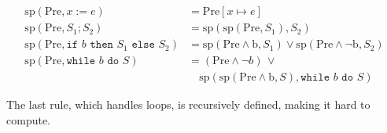 \documentclass[sigconf]{acmart}
\begin{document}
{\setlength{\abovedisplayskip}{2pt}
 \setlength{\belowdisplayskip}{2pt}
 \setlength{\jot}{1pt}
\begin{align*}
  \mathrm{sp}(\mathrm{Pre}, x := e) &= \mathrm{Pre}[x \mapsto e] \\
  \mathrm{sp}(\mathrm{Pre}, S_1; S_2) &= \mathrm{sp}(\mathrm{sp}(\mathrm{Pre}, S_1), S_2) \\
  \mathrm{sp}(\mathrm{Pre}, \texttt{if } b \texttt{ then } S_1 \texttt{ else } S_2) &=
      \mathrm{sp}(\mathrm{Pre \land b}, S_1) \vee
      \mathrm{sp}(\mathrm{Pre \land \neg b}, S_2) \\
  \mathrm{sp}(\mathrm{Pre}, \texttt{while } b \texttt{ do } S) &=
      (\mathrm{Pre} \land \neg b) \,\vee {}\\[-1mm]
  &\quad \mathrm{sp}(\mathrm{sp}(\mathrm{Pre \land b}, S),
      \texttt{while } b \texttt{ do } S)
\end{align*}}
\vspace{-2ex}



\noindent The last rule, which handles loops, is recursively defined, making it hard to compute.

    
    
    
\end{document}
